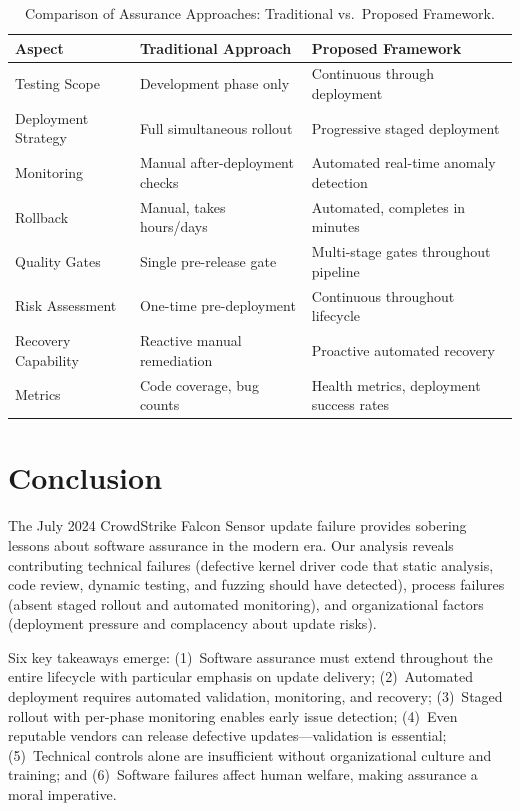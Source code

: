 \documentclass[sigconf,nonacm]{acmart}
\begin{document}
\begin{table}[t]
\caption{Comparison of Assurance Approaches: Traditional vs.\ Proposed Framework.}
\label{tab:comparison}
\small
\setlength{\tabcolsep}{5pt}
\begin{tabularx}{\textwidth}{@{}p{3.0cm}XX@{}}
\toprule
\textbf{Aspect} & \textbf{Traditional Approach} & \textbf{Proposed Framework} \\
\midrule
Testing Scope       & Development phase only           & Continuous through deployment \\
Deployment Strategy & Full simultaneous rollout         & Progressive staged deployment \\
Monitoring          & Manual after-deployment checks   & Automated real-time anomaly detection \\
Rollback            & Manual, takes hours/days         & Automated, completes in minutes \\
Quality Gates       & Single pre-release gate          & Multi-stage gates throughout pipeline \\
Risk Assessment     & One-time pre-deployment          & Continuous throughout lifecycle \\
Recovery Capability & Reactive manual remediation      & Proactive automated recovery \\
Metrics             & Code coverage, bug counts        & Health metrics, deployment success rates \\
\bottomrule
\end{tabularx}
\end{table}

\section{Conclusion}

The July 2024 CrowdStrike Falcon Sensor update failure provides sobering lessons about
software assurance in the modern era. Our analysis reveals contributing technical failures
(defective kernel driver code that static analysis, code review, dynamic testing, and
fuzzing should have detected), process failures (absent staged rollout and automated
monitoring), and organizational factors (deployment pressure and complacency about update
risks).

Six key takeaways emerge: (1)~Software assurance must extend throughout the entire
lifecycle with particular emphasis on update delivery; (2)~Automated deployment requires
automated validation, monitoring, and recovery; (3)~Staged rollout with per-phase
monitoring enables early issue detection; (4)~Even reputable vendors can release defective
updates---validation is essential; (5)~Technical controls alone are insufficient without
organizational culture and training; and (6)~Software failures affect human welfare,
making assurance a moral imperative.
\end{document}
